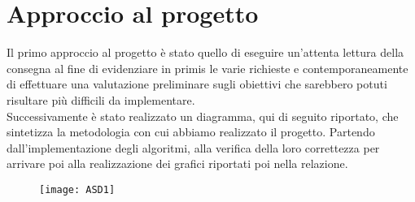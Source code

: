 \chapter{Approccio al progetto}
Il primo approccio al progetto è stato quello di eseguire un'attenta lettura della consegna al fine di evidenziare in primis le varie richieste e contemporaneamente di effettuare una valutazione preliminare sugli obiettivi che sarebbero potuti risultare più difficili da implementare.\vspace{2mm}
\\Successivamente è stato realizzato un diagramma, qui di seguito riportato, che sintetizza la metodologia con cui abbiamo realizzato il progetto. Partendo dall'implementazione degli algoritmi, alla verifica della loro correttezza per arrivare poi alla realizzazione dei grafici riportati poi nella relazione.

\begin{figure}[h!]
    \begin{center}
        \texttt{[image: ASD1]}\\
    \end{center}
\end{figure}